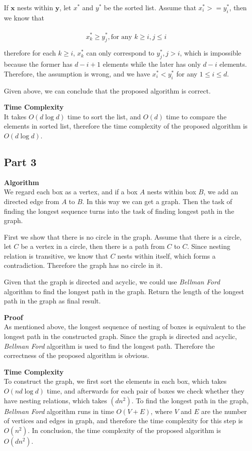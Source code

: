 \documentclass{article}
\newcommand{\Complexity}{\vspace{0.3cm} \noindent\textbf{Time Complexity} \\}
\newcommand{\Proof}{\vspace{0.3cm} \noindent\textbf{Proof} \\}
\newcommand{\Algorithm}{\textbf{Algorithm} \\}
\begin{document}
If $\mathbf{x}$ nests within $\mathbf{y}$, let $x^*$ and $y^*$ be the sorted list. Assume that
$x^*_i >= y^*_i$, then we know that 

\begin{align}
  \begin{split}  
  x^*_k \geq y^*_j, \text{for any } k \geq i, j \leq i  \\
  \end{split}
\end{align}
therefore for each $k \geq i$, $x^*_k$ can only correspond to $y^*_j, j > i$, which is impossible
because the former has $d - i + 1$ elements while the later has only $d-i$ elements. Therefore,
the assumption is wrong, and we have $x^*_i < y^*_i$ for any $1 \leq i \leq d$.

Given above, we can conclude that the proposed algorithm is correct.

\Complexity
It takes $O(d\log d)$ time to sort the list, and $O(d)$ time to compare the elements in sorted
list, therefore the time complexity of the proposed algorithm is $O(d\log d)$.

\subsection*{Part 3}
\Algorithm
We regard each box as a vertex, and if a box $A$ nests within box $B$, we add an directed edge from $A$
to $B$. In this way we can get a graph. Then the task of finding the longest sequence turns into the
task of finding longest path in the graph.

First we show that there is no circle in the graph. Assume that there is a circle, let $C$ be a vertex in a
circle, then there is a path from $C$ to $C$. Since nesting relation is transitive, we know that $C$
nests within itself, which forms a contradiction. Therefore the graph has no circle in it.

Given that the graph is directed and acyclic, we could use \textit{Bellman Ford} algorithm to find the longest
path in the graph. Return the length of the longest path in the graph as final result.

\Proof
As mentioned above, the longest sequence of nesting of boxes is equivalent to the longest path in
the constructed graph. Since the graph is directed and acyclic, \textit{Bellman Ford} algorithm is
used to find the longest path. Therefore the correctness of the proposed algorithm is obvious.

\Complexity
To construct the graph, we first sort the elements in each box, which takes $O(nd\log d)$ time, and
afterwards for each pair of boxes we check whether they have nesting relations, which takes
$(dn^2)$. To find the longest path in the graph, \textit{Bellman Ford} algorithm runs in time
$O(V+E)$, where $V$ and $E$ are the number of vertices and edges in graph, and therefore the time
complexity for this step is $O(n^2)$. In conclusion, the time complexity of the proposed algorithm
is $O(dn^2)$.
\end{document}
